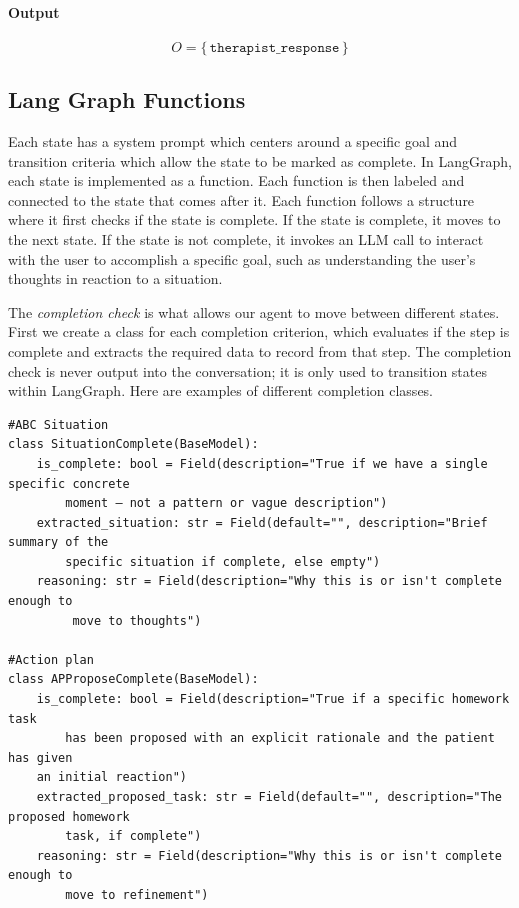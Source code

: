 \documentclass[twoside]{report}
\begin{document}
\paragraph{Output}
\[
O = \{\, \texttt{therapist\_response} \,\}
\]

\subsection{Lang Graph Functions}

Each state has a system prompt which centers around a specific goal and transition criteria which allow the state to be marked as complete. In LangGraph, each state is implemented as a function. Each function is then labeled and connected to the state that comes after it. Each function follows a structure where it first checks if the state is complete. If the state is complete, it moves to the next state. If the state is not complete, it invokes an LLM call to interact with the user to accomplish a specific goal, such as understanding the user's thoughts in reaction to a situation.

The \emph{completion check} is what allows our agent to move between different states. First we create a class for each completion criterion, which evaluates if the step is complete and extracts the required data to record from that step. The completion check is never output into the conversation; it is only used to transition states within LangGraph. Here are examples of different completion classes.

\begin{Verbatim}
#ABC Situation
class SituationComplete(BaseModel):
    is_complete: bool = Field(description="True if we have a single specific concrete 
    	moment — not a pattern or vague description")
    extracted_situation: str = Field(default="", description="Brief summary of the 
    	specific situation if complete, else empty")
    reasoning: str = Field(description="Why this is or isn't complete enough to
    	 move to thoughts")

#Action plan
class APProposeComplete(BaseModel):
    is_complete: bool = Field(description="True if a specific homework task 
    	has been proposed with an explicit rationale and the patient has given 
	an initial reaction")
    extracted_proposed_task: str = Field(default="", description="The proposed homework 
    	task, if complete")
    reasoning: str = Field(description="Why this is or isn't complete enough to 
    	move to refinement")
\end{Verbatim}
\end{document}
